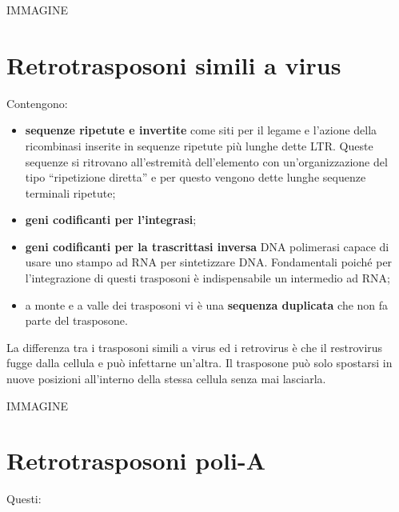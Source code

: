\documentclass[11pt]{book}
\begin{document}
IMMAGINE

\clearpage

\section{Retrotrasposoni simili a
virus}\label{retrotrasposoni-simili-a-virus}

Contengono:

\begin{itemize}
\itemsep1pt\parskip0pt
\item
  \textbf{sequenze ripetute e invertite} come siti per il legame e
  l'azione della ricombinasi inserite in sequenze ripetute più lunghe
  dette LTR. Queste sequenze si ritrovano all'estremità dell'elemento
  con un'organizzazione del tipo ``ripetizione diretta'' e per questo
  vengono dette lunghe sequenze terminali ripetute;
\item
  \textbf{geni codificanti per l'integrasi};
\item
  \textbf{geni codificanti per la trascrittasi inversa} DNA polimerasi
  capace di usare uno stampo ad RNA per sintetizzare DNA. Fondamentali
  poiché per l'integrazione di questi trasposoni è indispensabile un
  intermedio ad RNA;
\item
  a monte e a valle dei trasposoni vi è una \textbf{sequenza duplicata}
  che non fa parte del trasposone.
\end{itemize}

La differenza tra i trasposoni simili a virus ed i retrovirus è che il
restrovirus fugge dalla cellula e può infettarne un'altra. Il trasposone
può solo spostarsi in nuove posizioni all'interno della stessa cellula
senza mai lasciarla.

IMMAGINE

\section{Retrotrasposoni poli-A}\label{retrotrasposoni-poli-a}

Questi:
\end{document}
